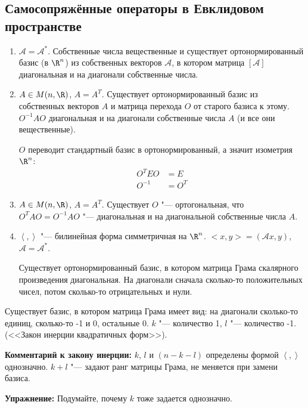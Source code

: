 \subsection{Самосопряжённые операторы в Евклидовом пространстве}

\begin{enumerate}
\item
	$\mathscr A = \mathscr{A}^*$.
	Собственные числа вещественные и существует ортонормированный базис (в $\R^n$) из собственных векторов $\mathscr A$,
	в котором матрица $[\mathscr A]$ диагональная и на диагонали собственные числа.

\item
	$A \in M(n, \R)$, $A = A^T$.
	Существует ортонормированный базис из собственных векторов $A$ и матрица перехода $O$ от старого базиса к этому.
	$O^{-1}AO$ диагональная и на диагонали собственные числа $A$ (и все они вещественные).

	$O$ переводит стандартный базис в ортонормированный, а значит изометрия $\R^n$:
	\begin{align*}
		O^T E O &= E \\
		O^{-1}  &= O^T
	\end{align*}

\item
	$A \in M(n,\R)$, $A = A^T$.
	Существует $O$ "--- ортогональная, что $O^TAO = O^{-1}AO$ "--- диагональная и на диагональной собственные числа $A$.

\item
	$\left<,\right>$ "--- билинейная форма симметричная на $\R^n$.
	$<x, y> = (\mathscr Ax, y)$, $\mathscr A = \mathscr{A}^*$.

	Существует ортонормированный базис, в котором матрица Грама скалярного произведения диагональная.
	На диагонали сначала сколько-то положительных чисел, потом сколько-то отрицательных и нули.
\end{enumerate}

\begin{conseq}
	Существует базис, в котором матрица Грама имеет вид: на диагонали сколько-то единиц, сколько-то -1 и 0, остальные 0.
	$k$ "--- количество 1, $l$ "--- количество -1.
	(<<Закон инерции квадратичных форм>>).
\end{conseq}

\textbf{Комментарий к закону инерции:}
$k$, $l$ и $(n - k - l)$ определены формой $\left<,\right>$ однозначно.
$k + l$ "--- задают ранг матрицы Грама, не меняется при замени базиса.

\textbf{Упражнение:}
Подумайте, почему $k$ тоже задается однозначно.
